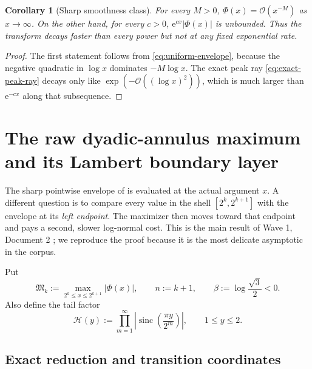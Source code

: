 \documentclass[11pt,oneside]{article}
\newtheorem{corollary}[corollary]{Corollary}
\theoremstyle{definition}
\theoremstyle{remark}
\newcommand{\e}{\mathrm e}
\newcommand{\sinc}{\operatorname{sinc}}
\newcommand{\Phiup}{\Phi}
\newcommand{\bigO}{\mathcal O}
\newcommand{\abs}[1]{\left|#1\right|}
\begin{document}
\begin{corollary}[Sharp smoothness class]
\label{cor:superpoly-subexp}
For every $M>0$, $\Phiup(x)=\bigO(x^{-M})$ as $x\to\infty$.  On the other hand, for every
$c>0$, $\e^{cx}\abs{\Phiup(x)}$ is unbounded.  Thus the transform decays faster than every
power but not at any fixed exponential rate.
\end{corollary}

\begin{proof}
The first statement follows from \eqref{eq:uniform-envelope}, because the negative
quadratic in $\log x$ dominates $-M\log x$.  The exact peak ray
\eqref{eq:exact-peak-ray} decays only like $\exp(-\bigO((\log x)^2))$, which is much larger
than $\e^{-cx}$ along that subsequence.
\end{proof}


\section{The raw dyadic-annulus maximum and its Lambert boundary layer}
\label{sec:annular-maxima}

The sharp pointwise envelope of  is evaluated at the actual
argument $x$.  A different question is to compare every value in the shell
$[2^k,2^{k+1}]$ with the envelope at its \emph{left endpoint}.  The maximizer then moves
toward that endpoint and pays a second, slower log-normal cost.  This is the main result of
Wave 1, Document 2 \cite{wave1-doc2}; we reproduce the proof because it is the most delicate
asymptotic in the corpus.

Put
\begin{equation}
 \mathfrak M_k:=\max_{2^k\le x\le2^{k+1}}|\Phiup(x)|,
 \qquad n:=k+1,
 \qquad \beta:=\log\frac{\sqrt3}{2}<0.
 \label{eq:annular-M}
\end{equation}
Also define the tail factor
\[
 \mathcal H(y):=\prod_{m=1}^{\infty}\left|\sinc\!\left(\frac{\pi y}{2^m}\right)\right|,
 \qquad 1\le y\le2.
\]

\subsection{Exact reduction and transition coordinates}
\end{document}
